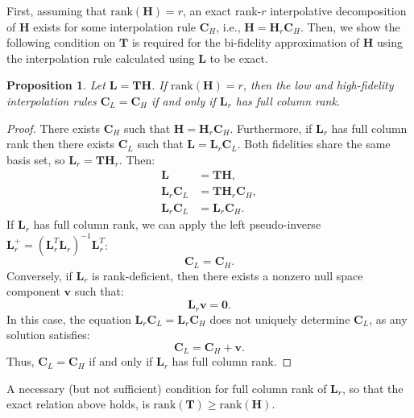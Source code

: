 \documentclass[preprint,10pt]{elsarticle}
\newtheorem{proposition}{Proposition}
\begin{document}
First, assuming that $\mathrm{rank}(\bm{H})=r$, an exact rank-$r$ interpolative decomposition of $\bm{H}$ exists for some interpolation rule $\bm{C}_H$, i.e., $\bm{H} = \bm{H}_r \bm{C}_H $. Then, we show the following condition on $\bm{T}$ is required for the bi-fidelity approximation of $\bm{H}$ using the interpolation rule calculated using $\bm{L}$ to be exact.

\begin{proposition}
    Let $\bm{L} = \bm{T} \bm{H}$. If  $\mathrm{rank}(\bm{H})=r$, then the low and high-fidelity interpolation rules $\bm{C}_L = \bm{C}_H$ if and only if $\bm{L}_r$ has full column rank.
\end{proposition}

\begin{proof}
    There exists $\bm{C}_H$ such that $\bm{H} = \bm{H}_r \bm{C}_H $. Furthermore, if $\bm{L}_r$ has full column rank then there exists $\bm{C}_L$ such that $ \bm{L} = \bm{L}_r \bm{C}_L $.
    Both fidelities share the same basis set, so $\bm{L}_r=\bm{T}\bm{H}_r$. Then:
    \begin{align*}
    \bm{L} &= \bm{T} \bm{H}, \\
        \bm{L}_r \bm{C}_L &= \bm{T} \bm{H}_r \bm{C}_H, \\
    \bm{L}_r \bm{C}_L &= \bm{L}_r \bm{C}_H.
    \end{align*}
    If $\bm{L}_r$ has full column rank, we can apply the left pseudo-inverse $\bm{L}_r^+ = (\bm{L}_r^T \bm{L}_r)^{-1} \bm{L}_r^T$:
    \begin{equation}
        \bm{C}_L = \bm{C}_H.
    \end{equation}
    Conversely, if $\bm{L}_r$ is rank-deficient, then there exists a nonzero null space component $\bm{v}$ such that:
    \begin{equation}
        \bm{L}_r \bm{v} = \bm{0}.
    \end{equation}
    In this case, the equation $\bm{L}_r \bm{C}_L = \bm{L}_r \bm{C}_H$ does not uniquely determine $\bm{C}_L$, as any solution satisfies:
    \begin{equation}
        \bm{C}_L = \bm{C}_H + \bm{v}.
    \end{equation}
    Thus, $\bm{C}_L = \bm{C}_H$ if and only if $\bm{L}_r$ has full column rank.
\end{proof}

A necessary (but not sufficient) condition for full column rank of $\bm{L}_r$, so that the exact relation above holds, is $\mathrm{rank}(\bm{T}) \ge \mathrm{rank}(\bm{H})$.
\end{document}
